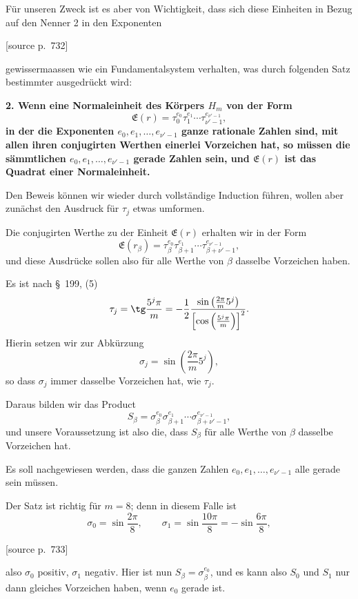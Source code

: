 \documentclass[11pt]{article}
\newcommand{\srcpage}[1]{\par\medskip\noindent\textsf{[source p.~#1]}\par\smallskip}
\begin{document}
Für unseren Zweck ist es aber von Wichtigkeit, dass sich diese Einheiten in Bezug auf den Nenner 2 in den Exponenten
\srcpage{732}
gewissermaassen wie ein Fundamentalsystem verhalten, was durch folgenden Satz bestimmter ausgedrückt wird:

\begin{center}\textbf{2. Wenn eine Normaleinheit des Körpers $H_m$ von der Form
\[
\mathfrak E(r)=\tau_0^{e_0}\tau_1^{e_1}\cdots\tau_{\nu'-1}^{e_{\nu'-1}},
\]
in der die Exponenten $e_0,e_1,\ldots,e_{\nu'-1}$ ganze rationale Zahlen sind, mit allen ihren conjugirten Werthen einerlei Vorzeichen hat, so müssen die sämmtlichen $e_0,e_1,\ldots,e_{\nu'-1}$ gerade Zahlen sein, und $\mathfrak E(r)$ ist das Quadrat einer Normaleinheit.}\end{center}

Den Beweis können wir wieder durch vollständige Induction führen, wollen aber zunächst den Ausdruck für $\tau_j$ etwas umformen.

Die conjugirten Werthe zu der Einheit $\mathfrak E(r)$ erhalten wir in der Form
\[
\mathfrak E(r_\beta)=\tau_\beta^{e_0}\tau_{\beta+1}^{e_1}\cdots\tau_{\beta+\nu'-1}^{e_{\nu'-1}},
\]
und diese Ausdrücke sollen also für alle Werthe von $\beta$ dasselbe Vorzeichen haben.

Es ist nach \S~199, (5)
\[
\tau_j=\tg\frac{5^j\pi}{m}=-\frac12\frac{\sin\left(\frac{2\pi}{m}5^j\right)}{\left[\cos\left(\frac{5^j\pi}{m}\right)\right]^2}.
\]
Hierin setzen wir zur Abkürzung
\begin{equation}
\sigma_j=\sin\left(\frac{2\pi}{m}5^j\right),
\tag{14}
\end{equation}
so dass $\sigma_j$ immer dasselbe Vorzeichen hat, wie $\tau_j$.

Daraus bilden wir das Product
\begin{equation}
S_\beta=\sigma_\beta^{e_0}\sigma_{\beta+1}^{e_1}\cdots\sigma_{\beta+\nu'-1}^{e_{\nu'-1}},
\tag{15}
\end{equation}
und unsere Voraussetzung ist also die, dass $S_\beta$ für alle Werthe von $\beta$ dasselbe Vorzeichen hat.

Es soll nachgewiesen werden, dass die ganzen Zahlen $e_0,e_1,\ldots,e_{\nu'-1}$ alle gerade sein müssen.

Der Satz ist richtig für $m=8$; denn in diesem Falle ist
\[
\sigma_0=\sin\frac{2\pi}{8},\qquad \sigma_1=\sin\frac{10\pi}{8}=-\sin\frac{6\pi}{8},
\]
\srcpage{733}
also $\sigma_0$ positiv, $\sigma_1$ negativ. Hier ist nun $S_\beta=\sigma_\beta^{e_0}$, und es kann also $S_0$ und $S_1$ nur dann gleiches Vorzeichen haben, wenn $e_0$ gerade ist.
\end{document}

